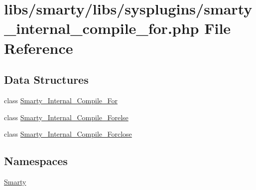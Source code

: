 \hypertarget{smarty__internal__compile__for_8php}{}\section{libs/smarty/libs/sysplugins/smarty\+\_\+internal\+\_\+compile\+\_\+for.php File Reference}
\label{smarty__internal__compile__for_8php}
\subsection*{Data Structures}
\begin{DoxyCompactItemize}
\item 
class \hyperlink{class_smarty___internal___compile___for}{Smarty\+\_\+\+Internal\+\_\+\+Compile\+\_\+\+For}
\item 
class \hyperlink{class_smarty___internal___compile___forelse}{Smarty\+\_\+\+Internal\+\_\+\+Compile\+\_\+\+Forelse}
\item 
class \hyperlink{class_smarty___internal___compile___forclose}{Smarty\+\_\+\+Internal\+\_\+\+Compile\+\_\+\+Forclose}
\end{DoxyCompactItemize}
\subsection*{Namespaces}
\begin{DoxyCompactItemize}
\item 
 \hyperlink{namespace_smarty}{Smarty}
\end{DoxyCompactItemize}
